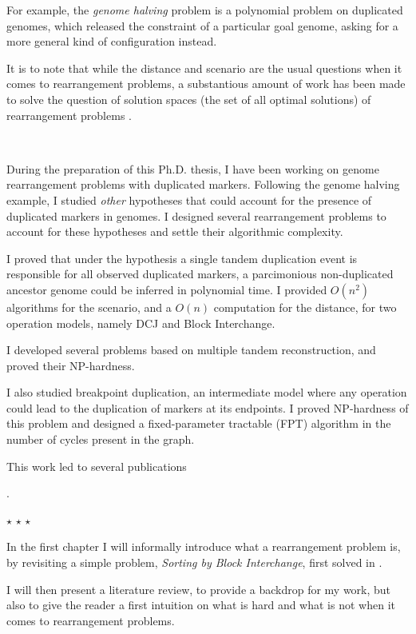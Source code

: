 \documentclass[11pt,final,twoside,nofrench]{thlifl}
\newcommand{\starline}{
  \bigskip \bigskip \bigskip
  \centerline{$\star$ \quad \quad \quad $\star$ \quad \quad \quad $\star$}
  \bigskip \bigskip \bigskip}
\begin{document}
For example, the \emph{genome halving} problem \cite{Mabrouk03}\cite{Mixtacki08} is a polynomial problem on duplicated genomes, which released the constraint of a particular goal genome, asking for a more general kind of configuration instead.

It is to note that while the distance and scenario are the usual questions when it comes to rearrangement problems, a substantious amount of work has been made to solve the question of solution spaces (the set of all optimal solutions) of rearrangement problems \cite{BS07} \cite{B09} \cite{BS10}.

~~

During the preparation of this Ph.D. thesis, I have been working on genome rearrangement problems with duplicated markers. Following the genome halving example, I studied \emph{other} hypotheses that could account for the presence of duplicated markers in genomes. I designed several rearrangement problems to account for these hypotheses and settle their algorithmic complexity.

I proved that under the hypothesis a single tandem duplication event is responsible for all observed duplicated markers, a parcimonious non-duplicated ancestor genome could be inferred in polynomial time. I provided $O(n^2)$ algorithms for the scenario, and a $O(n)$ computation for the distance, for two operation models, namely DCJ and Block Interchange.

I developed several problems based on multiple tandem reconstruction, and proved their NP-hardness.

I also studied breakpoint duplication, an intermediate model where any operation could lead to the duplication of markers at its endpoints. I proved NP-hardness of this problem and designed a fixed-parameter tractable (FPT) algorithm in the number of cycles present in the graph.

This work led to several publications \cite{Thomas11} \cite{Thomas13pre}

\noindent \cite{Thomas12} \cite{Thomas13}.

\clearpage

\starline

In the first chapter I will informally introduce what a rearrangement problem is, by revisiting a simple problem, \emph{Sorting by Block Interchange}, first solved in \cite{Christie96}.

I will then present a literature review, to provide a backdrop for my work, but also to give the reader a first intuition on what is hard and what is not when it comes to rearrangement problems.
\end{document}
